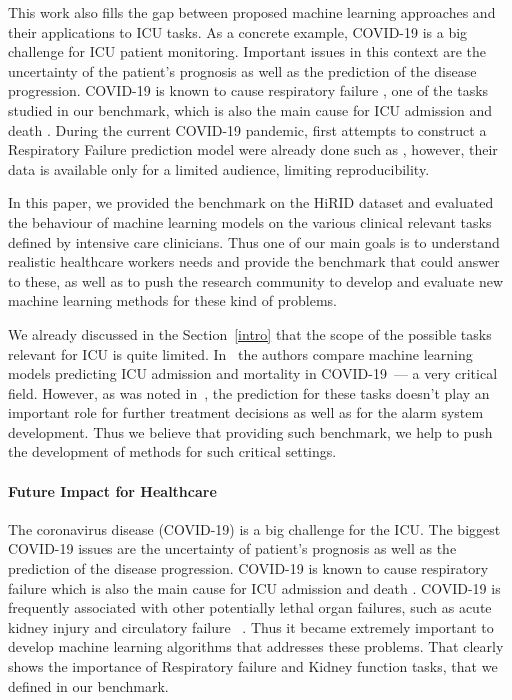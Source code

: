 \documentclass{article}
\begin{document}
This work also fills the gap between proposed machine learning approaches and their applications to ICU tasks. As a concrete example, COVID-19 is a big challenge for ICU patient monitoring. Important issues in this context are the uncertainty of the patient's prognosis as well as the prediction of the disease progression. COVID-19 is known to cause respiratory failure \cite{li2020neuroinvasive}, one of the tasks studied in our benchmark, which is also the main cause for ICU admission and death \cite{li2020acute, ruan2020clinical, richardson2020presenting, holter2020systemic}. During the current COVID-19 pandemic, first attempts to construct a Respiratory Failure prediction model were already done such as \cite{bolourani2021machine}, however, their data is available only for a limited audience, limiting
reproducibility.




\iffalse

In this paper, we provided the benchmark on the HiRID dataset and evaluated the behaviour of machine learning models on the various clinical relevant tasks defined by intensive care clinicians. Thus one of our main goals is to understand realistic healthcare workers needs and provide the benchmark that could answer to these, as well as to push the research community to develop and evaluate new machine learning methods for these kind of problems.


We already discussed in the Section~\ref{intro} that the scope of the possible tasks relevant for ICU is quite limited. In~\cite{subudhi2021comparing} the authors compare machine learning models predicting ICU admission and mortality in COVID-19~--- a very critical field. However, as was noted in~\cite{hyland2020early}, the prediction for these tasks doesn't play an important role for further treatment decisions as well as for the alarm system development. Thus we believe that providing such benchmark, we help to push the development of methods for such critical settings.  

\paragraph{Future Impact for Healthcare}
The coronavirus disease (COVID-19) is a big challenge for the ICU. The biggest COVID-19 issues are the uncertainty of patient's prognosis as well as the prediction of the disease progression. COVID-19 is known to cause respiratory failure \cite{li2020neuroinvasive} which is also the main cause for ICU admission and death \cite{li2020acute, ruan2020clinical, richardson2020presenting, holter2020systemic}. COVID-19 is frequently associated with other potentially lethal organ failures, such as acute kidney injury and circulatory failure ~\cite{cheng2020kidney, henry2020chronic}. Thus it became extremely important to develop machine learning algorithms that addresses these problems.  That clearly shows the importance of Respiratory failure and Kidney function tasks, that we defined in our benchmark. 
\end{document}
